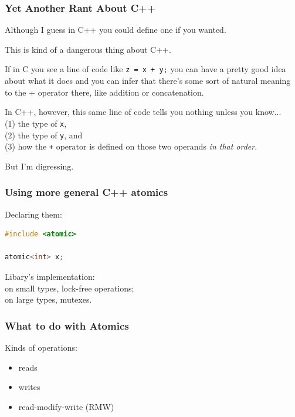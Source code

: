 \begin{frame}
\frametitle{Yet Another Rant About C++}

Although I guess in C++ you could define one if you wanted. 

This is kind of a dangerous thing about C++. 

If in C you see a line of code like \texttt{z = x + y;} you can have a pretty good idea about what it does and you can infer that there's some sort of natural meaning to the + operator there, like addition or concatenation. 

In C++, however, this same line of code tells you nothing unless you know...\\
\quad (1) the type of \texttt{x},\\
\quad (2) the type of \texttt{y}, and\\
\quad (3) how the \texttt{+} operator is defined on those two operands \textit{in that order}. 

But I'm digressing.


\end{frame}

\begin{frame}[fragile]
  \frametitle{Using more general C++ atomics}


    Declaring them:
  
\begin{lstlisting}[language=C]
#include <atomic>

atomic<int> x;
\end{lstlisting}

Libary's implementation: \\
\hspace*{1em} on small types, lock-free operations;\\
\hspace*{1em} on large types, mutexes.
  

\end{frame}

\begin{frame}
  \frametitle{What to do with Atomics}

  
    \Large
    Kinds of operations:
    \begin{itemize}
    \item reads
    \item writes
    \item read-modify-write (RMW)
    \end{itemize}
  
\end{frame}

